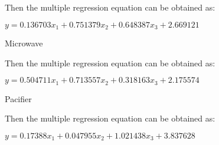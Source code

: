\documentclass[12pt]{article}
\begin{document}
\par
Then the multiple regression equation can be obtained as:\par$y=0.136703x_1+0.751379x_2+0.648387x_3+2.669121$
\par Microwave
\quad\par\quad\par\quad\par\quad\par\quad\par\quad\par\quad\par\quad\par\quad\par\quad\par
\quad\par\quad\par\quad\par\quad\par
\par
Then the multiple regression equation can be obtained as:\par$y=0.504711x_1+0.713557x_2+0.318163x_3+2.175574$
\par Pacifier
\quad\par\quad\par\quad\par\quad\par\quad\par\quad\par\quad\par\quad\par\quad\par\quad\par
\quad\par\quad\par\quad\par\quad\par\quad\par
\par
Then the multiple regression equation can be obtained as:\par$y=0.17388x_1+0.047955x_2+1.021438x_3+3.837628$
\end{document}
